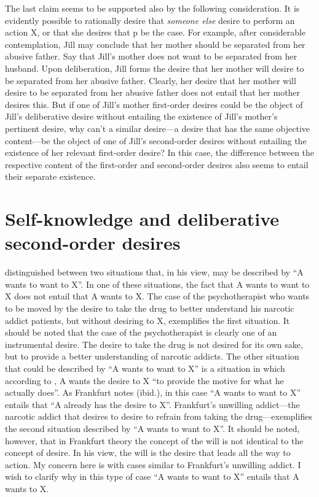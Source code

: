 \documentclass[output=paper,colorlinks,citecolor=brown
]{langscibook}
\begin{document}
The last claim seems to be supported also by the following consideration. It is evidently possible to rationally desire that \textit{someone else} desire to perform an action X, or that she desires that p be the case. For example, after considerable contemplation, Jill may conclude that her mother should be separated from her abusive father. Say that Jill's mother does not want to be separated from her husband. Upon deliberation, Jill forms the desire that her mother will desire to be separated from her abusive father. Clearly, her desire that her mother will desire to be separated from her abusive father does not entail that her mother desires this. But if one of Jill’s mother first-order desires could be the object of Jill’s deliberative desire without entailing the existence of Jill’s mother’s pertinent desire, why can't a similar desire—a desire that has the same objective content—be the object of one of Jill's second-order desires without entailing the existence of her relevant first-order desire? In this case, the difference between the respective content of the first-order and second-order desires also seems to entail their separate existence. 

\section{Self-knowledge and deliberative second-order desires}

\citet{frankfurt1988importance} distinguished between two situations that, in his view, may be described by “A wants to want to X”. In one of these situations, the fact that A wants to want to X does not entail that A wants to X. The case of the psychotherapist who wants to be moved by the desire to take the drug to better understand his narcotic addict patients, but without desiring to X, exemplifies the first situation. It should be noted that the case of the psychotherapist is clearly one of an instrumental desire. The desire to take the drug is not desired for its own sake, but to provide a better understanding of narcotic addicts. The other situation that could be described by “A wants to want to X” is a situation in which according to \citet[p.~15]{frankfurt1988importance}, A wants the desire to X “to provide the motive for what he actually does”. As Frankfurt notes (ibid.), in this case “A wants to want to X” entails that “A already has the desire to X”. Frankfurt's unwilling addict—the narcotic addict that desires to desire to refrain from taking the drug—exemplifies the second situation described by “A wants to want to X”. 
It should be noted, however, that in Frankfurt theory the concept of the will is not identical to the concept of desire. In his view, the will is the desire that leads all the way to action. My concern here is with cases similar to Frankfurt's unwilling addict.  I wish to clarify why in this type of case “A wants to want to X” entails that A wants to X.     
\end{document}
